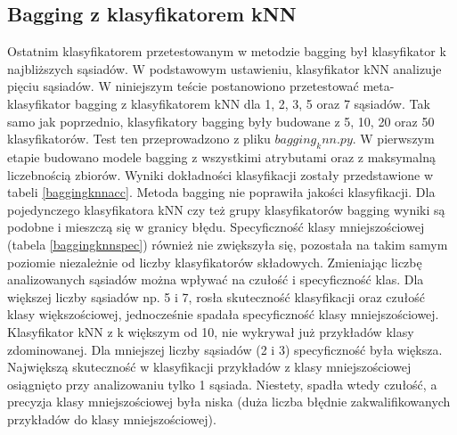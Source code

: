 \subsection{Bagging z klasyfikatorem kNN}
Ostatnim klasyfikatorem przetestowanym w metodzie bagging był klasyfikator k najbliższych sąsiadów. W podstawowym ustawieniu, klasyfikator kNN analizuje pięciu sąsiadów. W niniejszym teście postanowiono przetestować meta-klasyfikator bagging z klasyfikatorem kNN dla 1, 2, 3, 5 oraz 7 sąsiadów. Tak samo jak poprzednio, klasyfikatory bagging były budowane z 5, 10, 20 oraz 50 klasyfikatorów. Test ten przeprowadzono z pliku $bagging_knn.py$. W pierwszym etapie budowano modele bagging z wszystkimi atrybutami oraz z maksymalną liczebnością zbiorów. Wyniki dokładności klasyfikacji zostały przedstawione w tabeli \ref{baggingknnacc}. Metoda bagging nie poprawiła jakości klasyfikacji. Dla pojedynczego klasyfikatora kNN czy też grupy klasyfikatorów bagging wyniki są podobne i mieszczą się w granicy błędu. Specyficzność klasy mniejszościowej (tabela \ref{baggingknnspec}) również nie zwiększyła się, pozostała na takim samym poziomie niezależnie od liczby klasyfikatorów składowych. Zmieniając liczbę analizowanych sąsiadów można wpływać na czułość i specyficzność klas. Dla większej liczby sąsiadów np. 5 i 7, rosła skuteczność klasyfikacji oraz czułość klasy większościowej, jednocześnie spadała specyficzność klasy mniejszościowej. Klasyfikator kNN z k większym od 10, nie wykrywał już przykładów klasy zdominowanej. Dla mniejszej liczby sąsiadów (2 i 3) specyficzność była większa. Największą skuteczność w klasyfikacji przykładów z klasy mniejszościowej osiągnięto przy analizowaniu tylko 1 sąsiada. Niestety, spadła wtedy czułość, a precyzja klasy mniejszościowej była niska (duża liczba błędnie zakwalifikowanych przykładów do klasy mniejszościowej).
